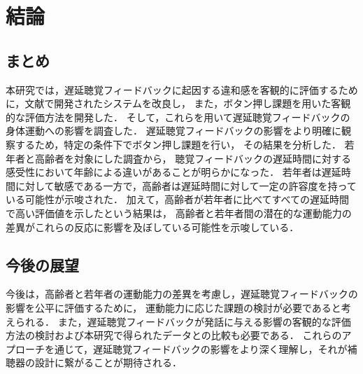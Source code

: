 \section{結論}
\subsection{まとめ}
本研究では，遅延聴覚フィードバックに起因する違和感を客観的に評価するために，文献\cite{cf:shigematu}で開発されたシステムを改良し，
また，ボタン押し課題を用いた客観的な評価方法を開発した．
そして，これらを用いて遅延聴覚フィードバックの身体運動への影響を調査した．
遅延聴覚フィードバックの影響をより明確に観察するため，特定の条件下でボタン押し課題を行い，
その結果を分析した．
若年者と高齢者を対象にした調査から，
聴覚フィードバックの遅延時間に対する感受性において年齢による違いがあることが明らかになった．
若年者は遅延時間に対して敏感である一方で，高齢者は遅延時間に対して一定の許容度を持っている可能性が示唆された．
加えて，高齢者が若年者に比べてすべての遅延時間で高い評価値を示したという結果は，
高齢者と若年者間の潜在的な運動能力の差異がこれらの反応に影響を及ぼしている可能性を示唆している．
\subsection{今後の展望}
今後は，高齢者と若年者の運動能力の差異を考慮し，遅延聴覚フィードバックの影響を公平に評価するために，
運動能力に応じた課題の検討が必要であると考えられる．
また，遅延聴覚フィードバックが発話に与える影響の客観的な評価方法の検討および本研究で得られたデータとの比較も必要である．
これらのアプローチを通じて，遅延聴覚フィードバックの影響をより深く理解し，それが補聴器の設計に繋がることが期待される．